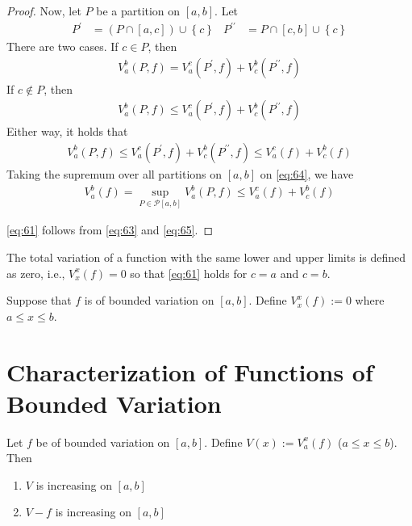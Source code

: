 \documentclass[thmcnt=section, 12pt]{elegantbook}
\begin{document}
\begin{proof}
    \par Now, let $P$ be a partition on $[a, b]$. Let
    \begin{align*}
        P^\prime &= (P \cap [a, c]) \cup \left\{c\right\} & 
        P^{\prime\prime} &= P \cap [c, b] \cup \left\{c\right\}
    \end{align*}
    There are two cases. If $c \in P$, then
    \begin{align*}
        V_a^b(P, f) 
        = V_a^c(P^\prime, f) + V_c^b(P^{\prime\prime}, f)
    \end{align*}
    If $c \notin P$, then 
    \begin{align*}
        V_a^b(P, f) 
        \leq V_a^c(P^\prime, f) + V_c^b(P^{\prime\prime}, f)
    \end{align*}
    Either way, it holds that 
    \begin{align}
        V_a^b(P, f) 
        \leq V_a^c(P^\prime, f) + V_c^b(P^{\prime\prime}, f)
        \leq V_a^c(f) + V_c^b(f)
        \label{eq:64}
    \end{align}
    Taking the supremum over all partitions on $[a, b]$ on \eqref{eq:64}, we have 
    \begin{align}
        V_a^b(f)
        = \sup_{P \in \mathcal{P}[a, b]} V_a^b(P, f) 
        \leq V_a^c(f) + V_c^b(f)
        \label{eq:65}
    \end{align}

    \par \eqref{eq:61} follows from \eqref{eq:63} and \eqref{eq:65}.
\end{proof}

\par The total variation of a function with the same lower and upper limits is defined as zero, i.e.,  $V_x^x(f) = 0$ so that \eqref{eq:61} holds for $c = a$ and $c = b$.

\begin{definition} \label{def:8}
    Suppose that $f$ is of bounded variation on $[a, b]$. Define $V_x^x(f) := 0$ where $a \leq x \leq b$.
\end{definition}


\section{Characterization of Functions of Bounded Variation}


\begin{lemma} \label{lem:3}
    Let $f$ be of bounded variation on $[a, b]$. Define $V(x) := V_a^x(f)$ ($a \leq x \leq b$). Then 
    \begin{enumerate}
        \item $V$ is increasing on $[a, b]$
        \item $V-f$ is increasing on $[a, b]$
    \end{enumerate}
\end{lemma}
\end{document}

